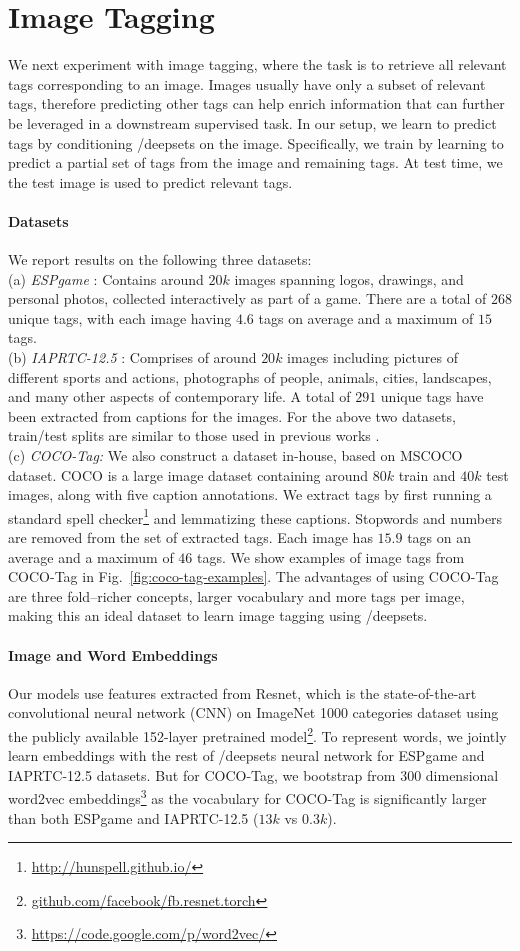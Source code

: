 \documentclass{article}
\newcommand{\compactparagraph}[1]{\vspace*{-10pt}\paragraph{#1}}
\newcommand{\reffig}[1]{Fig.~\ref{#1}}
\begin{document}
\newpage
\section{Image Tagging}
\label{app:image-tagging-details}
We next experiment with image tagging, where the task is to retrieve all relevant tags corresponding to an image. Images usually have only a subset of relevant tags, therefore predicting other tags can help enrich information that can further be leveraged in a downstream supervised task. In our setup, we learn to predict tags by conditioning /deepsets on the image. Specifically, we train by learning to predict a partial set of tags from the image and remaining tags. At test time, we the test image is used to predict relevant tags.

\compactparagraph{Datasets}
We report results on the following three datasets:\\ 
(a) \emph{ESPgame} \cite{von2004labeling}: Contains around $20k$ images spanning logos, drawings, and personal photos, collected interactively as part of a game. There are a total of $268$ unique tags, with each image having $4.6$ tags on average and a maximum of $15$ tags.\\
(b) \emph{IAPRTC-12.5} \cite{trove.nla.gov.au/work/3578667}: Comprises of around $20k$ images including pictures of different sports and actions, photographs of people, animals, cities, landscapes, and many other aspects of contemporary life. A total of $291$ unique tags have been extracted from captions for the images. For the above two datasets, train/test splits are similar to those used in previous works \cite{guillaumin2009tagprop, chen2013fast}.\\
(c) \emph{COCO-Tag: } We also construct a dataset in-house, based on MSCOCO dataset\cite{lin2014microsoft}. COCO is a large image dataset containing around $80k$ train and $40k$ test images, along with five caption annotations. We extract tags by first running a standard spell checker\footnote{\url{http://hunspell.github.io/}} and lemmatizing these captions. Stopwords and numbers are removed from the set of extracted tags. Each image has $15.9$ tags on an average and a maximum of $46$ tags. We show examples of image tags from COCO-Tag in \reffig{fig:coco-tag-examples}. The advantages of using COCO-Tag are three fold--richer concepts, larger vocabulary and more tags per image, making this an ideal dataset to learn image tagging using /deepsets.

\compactparagraph{Image and Word Embeddings}
Our models use features extracted from Resnet, which is the state-of-the-art convolutional neural network (CNN) on ImageNet 1000 categories dataset using the publicly available 152-layer pretrained model\footnote{\url{github.com/facebook/fb.resnet.torch}}. To represent words, we jointly learn embeddings with the rest of /deepsets neural network for ESPgame and IAPRTC-12.5 datasets. But for COCO-Tag, we bootstrap from $300$ dimensional word2vec embeddings\footnote{\url{https://code.google.com/p/word2vec/}} as the vocabulary for COCO-Tag is significantly larger than both ESPgame and IAPRTC-12.5 ($13k$ vs $0.3k$).
\end{document}
